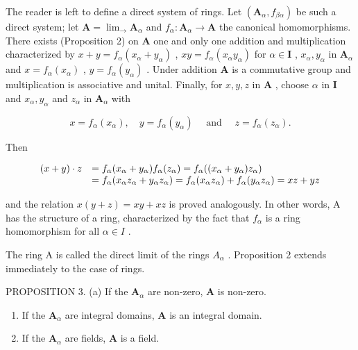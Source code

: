 The reader is left to define a direct system of rings. Let \((\mathbf{A}_{\alpha}, f_{\beta \alpha})\) be such a direct system; let \(\mathbf{A} = \lim_{\longrightarrow} \mathbf{A}_{\alpha}\) and \(f_{\alpha}: \mathbf{A}_{\alpha} \to \mathbf{A}\) the canonical homomorphisms. There exists (Proposition 2) on \(\mathbf{A}\) one and only one addition and multiplication characterized by \(x + y = f_{\alpha}(x_{\alpha} + y_{\alpha})\) , \(xy = f_{\alpha}(x_{\alpha}y_{\alpha})\) for \(\alpha \in \mathbf{I}\) , \(x_{\alpha}, y_{\alpha}\) in \(\mathbf{A}_{\alpha}\) and \(x = f_{\alpha}(x_{\alpha})\) , \(y = f_{\alpha}(y_{\alpha})\) . Under addition \(\mathbf{A}\) is a commutative group and multiplication is associative and unital. Finally, for \(x, y, z\) in \(\mathbf{A}\) , choose \(\alpha\) in \(\mathbf{I}\) and \(x_{\alpha}, y_{\alpha}\) and \(z_{\alpha}\) in \(\mathbf{A}_{\alpha}\) with

\[
x = f _ {\alpha} (x _ {\alpha}), \quad y = f _ {\alpha} (y _ {\alpha}) \quad \text { and } \quad z = f _ {\alpha} (z _ {\alpha}).
\]

Then

\[
\begin{array}{r l} (x + y) \cdot z & = f _ {\alpha} (x _ {\alpha} + y _ {\alpha}) f _ {\alpha} (z _ {\alpha}) = f _ {\alpha} ((x _ {\alpha} + y _ {\alpha}) z _ {\alpha}) \\ & = f _ {\alpha} (x _ {\alpha} z _ {\alpha} + y _ {\alpha} z _ {\alpha}) = f _ {\alpha} (x _ {\alpha} z _ {\alpha}) + f _ {\alpha} (y _ {\alpha} z _ {\alpha}) = x z + y z \end{array}
\]

and the relation \(x(y + z) = xy + xz\) is proved analogously. In other words, A has the structure of a ring, characterized by the fact that \(f_{\alpha}\) is a ring homomorphism for all \(\alpha \in I\) .

The ring A is called the direct limit of the rings \(A_{\alpha}\) . Proposition 2 extends immediately to the case of rings.

PROPOSITION 3. (a) If the \(\mathbf{A}_{\alpha}\) are non-zero, \(\mathbf{A}\) is non-zero.

\begin{enumerate}
\def\labelenumi{(\alph{enumi})}
\setcounter{enumi}{1}
\item
  If the \(\mathbf{A}_{\alpha}\) are integral domains, \(\mathbf{A}\) is an integral domain.
\item
  If the \(\mathbf{A}_{\alpha}\) are fields, \(\mathbf{A}\) is a field.
\end{enumerate}

